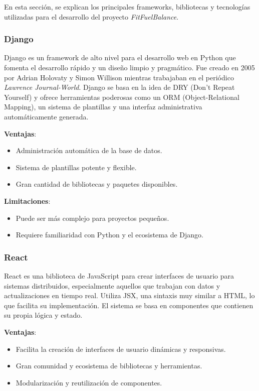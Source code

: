 En esta sección, se explican los principales frameworks, bibliotecas y tecnologías utilizadas para el desarrollo del proyecto \textit{FitFuelBalance}.

\subsubsection{Django}

Django es un framework de alto nivel para el desarrollo web en Python que fomenta el desarrollo rápido y un diseño limpio y pragmático. Fue creado en 2005 por Adrian Holovaty y Simon Willison mientras trabajaban en el periódico \textit{Lawrence Journal-World}. Django se basa en la idea de DRY (Don’t Repeat Yourself) y ofrece herramientas poderosas como un ORM (Object-Relational Mapping), un sistema de plantillas y una interfaz administrativa automáticamente generada.

\textbf{Ventajas}:
\begin{itemize}
  \item Administración automática de la base de datos.
  \item Sistema de plantillas potente y flexible.
  \item Gran cantidad de bibliotecas y paquetes disponibles.
\end{itemize}

\textbf{Limitaciones}:
\begin{itemize}
  \item Puede ser más complejo para proyectos pequeños.
  \item Requiere familiaridad con Python y el ecosistema de Django.
\end{itemize}

\subsubsection{React}

React es una biblioteca de JavaScript para crear interfaces de usuario para sistemas distribuidos, especialmente aquellos que trabajan con datos y actualizaciones en tiempo real. Utiliza JSX, una sintaxis muy similar a HTML, lo que facilita su implementación. El sistema se basa en componentes que contienen su propia lógica y estado.

\textbf{Ventajas}:
\begin{itemize}
  \item Facilita la creación de interfaces de usuario dinámicas y responsivas.
  \item Gran comunidad y ecosistema de bibliotecas y herramientas.
  \item Modularización y reutilización de componentes.
\end{itemize}

